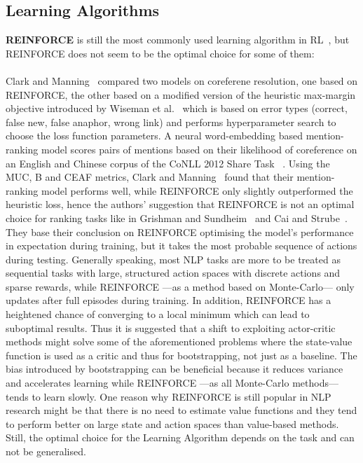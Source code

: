 \documentclass[11pt]{article}
\begin{document}
\subsection{Learning Algorithms}\label{learningalgo}
\textbf{REINFORCE} is still the most commonly used learning algorithm in RL~\cite{yasui-etal-2019,zhang-2018,hu-etal-2018-playing,godin-etal-2019-learning,huang-etal-2018-neural,mao-etal-2018-end,ranzato2015sequence,wu-etal-2018-study,clark-manning-2016-deep,yogatama-2017,guu-etal-2017-language,zeng-2018}, but REINFORCE does not seem to be the optimal choice for some of them:\\\\ Clark and Manning~ compared two models on coreferene resolution, one based on REINFORCE, the other based on a modified version of the heuristic max-margin objective introduced by Wiseman et al.~ which is based on error types (correct, false new, false anaphor, wrong link) and performs hyperparameter search to choose the loss function parameters. A neural word-embedding based mention-ranking model scores pairs of mentions based on their likelihood of coreference on an English and Chinese corpus of the CoNLL 2012 Share Task ~\cite{conll-2012}. Using the MUC, B and CEAF metrics, Clark and Manning~ found that their mention-ranking model performs well, while REINFORCE only slightly outperformed the heuristic loss, hence the authors' suggestion that REINFORCE is not an optimal choice for ranking tasks like in Grishman and Sundheim~ and Cai and Strube~. They base their conclusion on REINFORCE optimising the model's performance in expectation during training, but it takes the most probable sequence of actions during testing. Generally speaking, most NLP tasks are more to be treated as sequential tasks with large, structured action spaces with discrete actions and sparse rewards, while REINFORCE ---as a method based on Monte-Carlo--- only updates after full episodes during training. In addition, REINFORCE has a heightened chance of converging to a local minimum which can lead to suboptimal results. Thus it is suggested that a shift to exploiting actor-critic methods might solve some of the aforementioned problems where the state-value function is used as a critic and thus for bootstrapping, not just as a baseline. The bias introduced by bootstrapping can be beneficial because it reduces variance and accelerates learning while REINFORCE ---as all Monte-Carlo methods--- tends to learn slowly. One reason why REINFORCE is still popular in NLP research might be that there is no need to estimate value functions and they tend to perform better on large state and action spaces than value-based methods. Still, the optimal choice for the Learning Algorithm depends on the task and can not be generalised. \\\\
\end{document}
